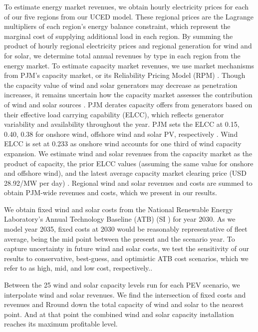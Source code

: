 \documentclass[9pt,twocolumn,twoside,lineno]{pnas-new}
\begin{document}
{To estimate energy market revenues, we obtain hourly electricity prices for each of our five regions from our UCED model. These regional prices are the Lagrange multipliers of each region's energy balance constraint, which represent the marginal cost of supplying additional load in each region. By summing the product of hourly regional electricity prices and regional generation for wind and for solar, we determine total annual revenues by type in each region from the energy market. To estimate capacity market revenues, we use market mechanisms from PJM's capacity market, or its Reliability Pricing Model (RPM) \cite{pjm_pjm_2023}. Though the capacity value of wind and solar generators may decrease as penetration increases, it remains uncertain how the capacity market assesses the contribution of wind and solar sources \cite{mills_impacts_2020,bhagwat_effectiveness_2017}. PJM derates capacity offers from generators based on their effective load carrying capability (ELCC), which reflects generator variability and availability throughout the year. PJM sets the ELCC at 0.15, 0.40, 0.38 for onshore wind, offshore wind and solar PV, respectively \cite{noauthor_20232024_2021}. Wind ELCC is set at 0.233 as onshore wind accounts for one third of wind capacity expansion. We estimate wind and solar revenues from the capacity market as the product of capacity, the prior ELCC values (assuming the same value for onshore and offshore wind), and the latest average capacity market clearing price (USD 28.92/MW per day) \cite{noauthor_20232024_2021}. Regional wind and solar revenues and costs are summed to obtain PJM-wide revenues and costs, which we present in our results.

We obtain fixed wind and solar costs from the National Renewable Energy Laboratory's Annual Technology Baseline (ATB) (SI \cite{vimmerstedt_2022_2022}) for year 2030. As we model year 2035, fixed costs at 2030 would be reasonably representative of fleet average, being the mid point between the present and the scenario year. To capture uncertainty in future wind and solar costs, we test the sensitivity of our results to conservative, best-guess, and optimistic ATB cost scenarios, which we refer to as high, mid, and low cost, respectively.\cite{bruchon_cleaning_2024}. 

Between the 25 wind and solar capacity levels run for each PEV scenario, we interpolate wind and solar revenues. We find the intersection of fixed costs and revenues and Rround down the total capacity of wind and solar to the nearest point. And at that point the  combined wind and solar capacity installation reaches its maximum profitable level. 

}
\end{document}
